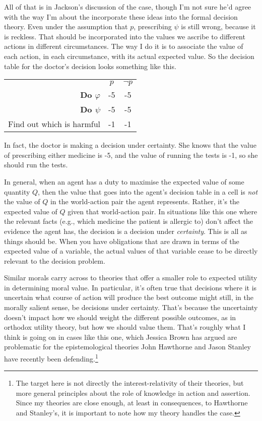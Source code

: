 All of that is in Jackson's discussion of the case, though I'm not sure he'd agree with the way I'm about the incorporate these ideas into the formal decision theory. Even under the assumption that $p$, prescribing $\psi$ is still wrong, because it is reckless. That should be incorporated into the values we ascribe to different actions in different circumstances. The way I do it is to associate the value of each action, in each circumstance, with its actual expected value. So the decision table for the doctor's decision looks something like this.

\begin{center}
\begin{tabular}{r c c}
 & $p$ & $\neg p$ \\
\textbf{Do $\varphi$} & -5 & -5 \\
\textbf{Do $\psi$} & -5 & -5 \\
Find out which is harmful & -1 & -1 \\
\end{tabular}
\end{center}

\noindent In fact, the doctor is making a decision under certainty. She knows that the value of prescribing either medicine is -5, and the value of running the tests is -1, so she should run the tests.

In general, when an agent has a duty to maximise the expected value of some quantity $Q$, then the value that goes into the agent's decision table in a cell is \textit{not} the value of $Q$ in the world-action pair the agent represents. Rather, it's the expected value of $Q$ given that world-action pair. In situations like this one where the relevant facts (e.g., which medicine the patient is allergic to) don't affect the evidence the agent has, the decision is a decision under \textit{certainty}. This is all as things should be. When you have obligations that are drawn in terms of the expected value of a variable, the actual values of that variable cease to be directly relevant to the decision problem.

Similar morals carry across to theories that offer a smaller role to expected utility in determining moral value. In particular, it's often true that decisions where it is uncertain what course of action will produce the best outcome might still, in the morally salient sense, be decisions under certainty. That's because the uncertainty doesn't impact how we should weight the different possible outcomes, as in orthodox utility theory, but how we should value them. That's roughly what I think is going on in cases like this one, which Jessica Brown has argued are problematic for the epistemological theories John Hawthorne and Jason Stanley have recently been defending.\footnote{The target here is not directly the interest-relativity of their theories, but more general principles about the role of knowledge in action and assertion. Since my theories are close enough, at least in consequences, to Hawthorne and Stanley's, it is important to note how my theory handles the case.}

